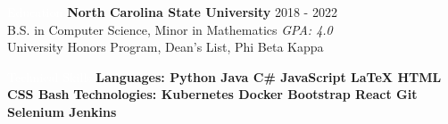 \documentclass{resume} %
\begin{document}
\setlength\fboxsep{0.33em}

\begin{rSection}{\colorbox{NCSURED}{\textcolor{WHITE}{Education}}}
{\bf North Carolina State University} \hfill {2018 - 2022} \\ 
B.S. in Computer Science, Minor in Mathematics \hfill {\em GPA: 4.0}\\
University Honors Program, Dean's List, Phi Beta Kappa

\end{rSection}

\begin{rSection}{\colorbox{NCSURED}{\textcolor{WHITE}{Technical Skills}}}
	\textbf{Languages:
		\hspace*{0.275cm}
		{Python} \textbar
		{ Java} \textbar
		{ C\#} \textbar
		{ JavaScript} \textbar
		{ \LaTeX} \textbar
		{ HTML} \textbar
		{ CSS} \textbar
		{ Bash}
	} \newline
	\textbf{Technologies:
		{Kubernetes} \textbar
		{ Docker} \textbar
		{ Bootstrap} \textbar
		{ React} \textbar
		{ Git} \textbar
		{ Selenium} \textbar
		{ Jenkins}
	}	
\end{rSection}
\end{document}
